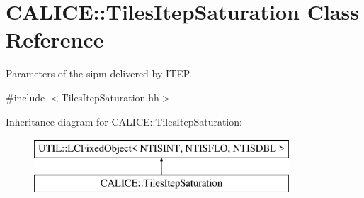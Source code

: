\section{C\-A\-L\-I\-C\-E\-:\-:Tiles\-Itep\-Saturation Class Reference}
\label{classCALICE_1_1TilesItepSaturation}


Parameters of the sipm delivered by I\-T\-E\-P.  




{\ttfamily \#include $<$Tiles\-Itep\-Saturation.\-hh$>$}

Inheritance diagram for C\-A\-L\-I\-C\-E\-:\-:Tiles\-Itep\-Saturation\-:\begin{figure}[H]
\begin{center}
\leavevmode
\includegraphics[height=2.000000cm]{classCALICE_1_1TilesItepSaturation}
\end{center}
\end{figure}
